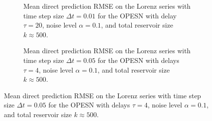 \begin{figure}
    \centering

    \begin{subfigure}{\textwidth}
        \caption{Mean direct prediction RMSE on the Lorenz series with time step size $\Delta t=0.01$ for the OPESN with delay $\tau=20$, noise level $\alpha=0.1$, and total reservoir size $k\approx500$.}
        \label{fig:OPESN_direct_0_01}
        \centering
    \end{subfigure}

    \vspace{0.5em}

    \begin{subfigure}{\textwidth}
        \caption{Mean direct prediction RMSE on the Lorenz series with time step size $\Delta t=0.05$ for the OPESN with delays $\tau=4$, noise level $\alpha=0.1$, and total reservoir size $k\approx500$.}
        \label{fig:OPESN_direct_0_05}
        \centering
    \end{subfigure}


\end{figure}
